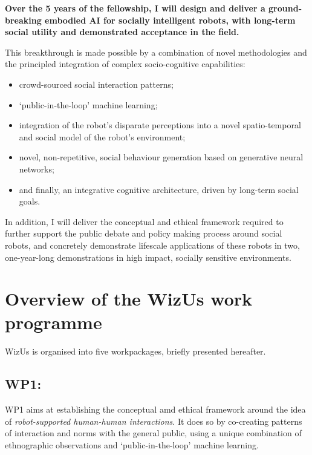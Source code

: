 \documentclass[11pt,a4paper]{report}
\newcommand{\project}{WizUs\xspace}
\begin{document}
\begin{framed}

\bf Over the 5 years of the fellowship, I will design and deliver a ground-breaking embodied AI for
socially intelligent robots, with long-term social utility and demonstrated
    acceptance in the field.
    
This breakthrough is made possible by a combination of novel methodologies and
the principled integration of complex socio-cognitive capabilities:
\begin{itemize}
        \item crowd-sourced social interaction patterns;
        \item `public-in-the-loop' machine learning;
        \item integration of the robot's disparate perceptions into a novel
            spatio-temporal and social model of the robot's environment;
        \item novel, non-repetitive, social behaviour generation based on
            generative neural networks;
        \item and finally, an integrative cognitive architecture, driven by
            long-term social goals.
\end{itemize}

In addition, I will deliver the conceptual and ethical framework required to
further support the public debate and policy making process around social
robots, and concretely demonstrate lifescale applications of these robots in
two, one-year-long demonstrations in high impact, socially sensitive environments.

\end{framed}

\section{Overview of the \project work programme}

\project is organised into five workpackages, briefly presented hereafter.

\subsection{WP1: \textbf{\wpOne}}

WP1 aims at establishing the conceptual amd ethical framework around the idea of
\emph{robot-supported human-human interactions}. It does so by co-creating
patterns of interaction and norms with the general public, using a unique
combination of ethnographic observations and `public-in-the-loop' machine
learning.
\end{document}
